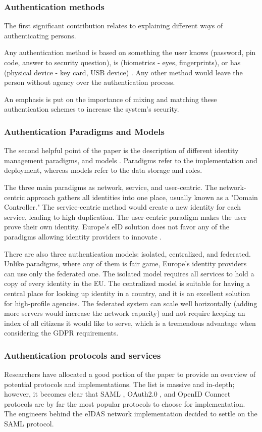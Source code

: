 \subsubsection{Authentication methods}

The first significant contribution relates to explaining different ways of authenticating persons.

Any authentication method is based on something the user knows (password, pin code, answer to security question), is (biometrics - eyes, fingerprints), or has (physical device - key card, USB device) \cite{o2003comparing}. Any other method would leave the person without agency over the authentication process.

An emphasis is put on the importance of mixing and matching these authentication schemes to increase the system's security.

\subsubsection{Authentication Paradigms and Models}

The second helpful point of the paper is the description of different identity management paradigms, and models \cite{identity-paradigms}. Paradigms refer to the implementation and deployment, whereas models refer to the data storage and roles.

The three main paradigms as network, service, and user-centric. The network-centric approach gathers all identities into one place, usually known as a "Domain Controller." The service-centric method would create a new identity for each service, leading to high duplication. The user-centric paradigm makes the user prove their own identity. Europe's eID solution does not favor any of the paradigms allowing identity providers to innovate \cite{eelaw-idcard,eeid,dokobit}.

There are also three authentication models: isolated, centralized, and federated. Unlike paradigms, where any of them is fair game, Europe's identity providers can use only the federated one. The isolated model requires all services to hold a copy of every identity in the EU. The centralized model is suitable for having a central place for looking up identity in a country, and it is an excellent solution for high-profile agencies. The federated system can scale well horizontally (adding more servers would increase the network capacity) and not require keeping an index of all citizens it would like to serve, which is a tremendous advantage when considering the GDPR requirements.

\subsubsection{Authentication protocols and services}

Researchers have allocated a good portion of the paper to provide an overview of potential protocols and implementations. The list is massive and in-depth; however, it becomes clear that SAML \cite{saml}, OAuth2.0 \cite{rfc6749}, and OpenID Connect \cite{oidc} protocols are by far the most popular protocols to choose for implementation. The engineers behind the eIDAS network implementation decided to settle on the SAML protocol.